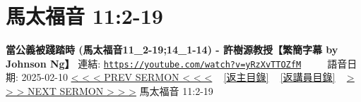 \documentclass{book}
\begin{document}
\section{馬太福音 11:2-19}
\label{sec:yRzXvTTOZfM}
\textbf{當公義被踐踏時  (馬太福音11\_2-19;14\_1-14) - 許樹源教授【繁簡字幕 by Johnson Ng】}
\newline
\newline
連結: \href{https://youtube.com/watch?v=yRzXvTTOZfM}{\texttt{https://youtube.com/watch?v=yRzXvTTOZfM}} ~~~~ 語音日期: 2025-02-10
\newline
\newline
\hyperref[sec:pVOG1onrqjE]{< < < PREV SERMON < < <}
~
\hyperlink{toc}{[返主目錄]}
~
\hyperref[ch:preacher13]{[返講員目錄]}
~
\hyperref[sec:srCkvhUNl9w]{> > > NEXT SERMON > > >}
\newline
\newline
馬太福音 11:2-19
\newline
\end{document}
